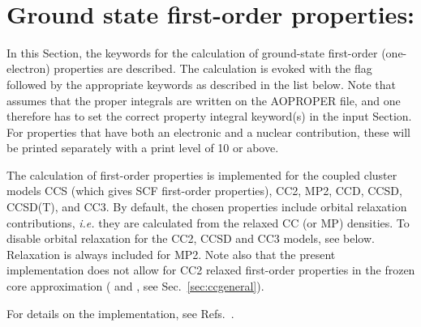 ~%
\section{Ground state first-order properties: }
\label{sec:ccfop}

In this Section, the keywords for the calculation of ground-state first-order
(one-electron) properties are described. The calculation
is evoked with the  flag followed by the appropriate
keywords as described in the list below. Note that 
assumes that the proper integrals are written on the
AOPROPER file, and one therefore has to set the correct property
integral keyword(s) in the  input Section. For properties
that have both an electronic and a nuclear contribution, these will
be printed separately with a print level of 10 or above.

The calculation of first-order properties is implemented for the 
coupled cluster models CCS (which gives SCF first-order properties),
CC2, MP2, CCD,  CCSD, CCSD(T), and CC3.  
By default, the chosen properties include orbital relaxation
contributions,
{\it i.e.\/} they are calculated from the relaxed CC (or MP) densities. 
To disable orbital relaxation for the CC2, CCSD and CC3 models, 
see  below. Relaxation is always included for MP2. 
Note also that the present implementation does not allow for 
CC2 relaxed first-order
properties in the frozen core approximation 
( and , see Sec.~\ref{sec:ccgeneral}).

For details on the implementation, see 
Refs.~\cite{Halkier:CCFOP,Halkier:CC2RLXFOP,Hald:CCPTFOP}.

\begin{center}
\end{center}

